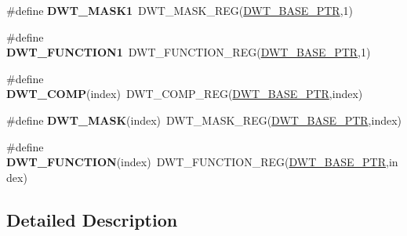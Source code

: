 \begin{DoxyCompactItemize}
\#define {\bfseries D\+W\+T\+\_\+\+M\+A\+S\+K1}~D\+W\+T\+\_\+\+M\+A\+S\+K\+\_\+\+R\+EG(\hyperlink{group___d_w_t___peripheral_ga3b46dfb2ea7946c6938028d879c82cb1}{D\+W\+T\+\_\+\+B\+A\+S\+E\+\_\+\+P\+TR},1)
\item 
\mbox{\label{group___d_w_t___register___accessor___macros_ga6e512f90919120ad3ecf145caafef873}} 
\#define {\bfseries D\+W\+T\+\_\+\+F\+U\+N\+C\+T\+I\+O\+N1}~D\+W\+T\+\_\+\+F\+U\+N\+C\+T\+I\+O\+N\+\_\+\+R\+EG(\hyperlink{group___d_w_t___peripheral_ga3b46dfb2ea7946c6938028d879c82cb1}{D\+W\+T\+\_\+\+B\+A\+S\+E\+\_\+\+P\+TR},1)
\item 
\mbox{\label{group___d_w_t___register___accessor___macros_ga0b043412191960b9db65c179caef9291}} 
\#define {\bfseries D\+W\+T\+\_\+\+C\+O\+MP}(index)~D\+W\+T\+\_\+\+C\+O\+M\+P\+\_\+\+R\+EG(\hyperlink{group___d_w_t___peripheral_ga3b46dfb2ea7946c6938028d879c82cb1}{D\+W\+T\+\_\+\+B\+A\+S\+E\+\_\+\+P\+TR},index)
\item 
\mbox{\label{group___d_w_t___register___accessor___macros_ga19be475d2412ec79ba2fd2a835ce6055}} 
\#define {\bfseries D\+W\+T\+\_\+\+M\+A\+SK}(index)~D\+W\+T\+\_\+\+M\+A\+S\+K\+\_\+\+R\+EG(\hyperlink{group___d_w_t___peripheral_ga3b46dfb2ea7946c6938028d879c82cb1}{D\+W\+T\+\_\+\+B\+A\+S\+E\+\_\+\+P\+TR},index)
\item 
\mbox{\label{group___d_w_t___register___accessor___macros_ga0ef1d1ba0a2ddfb38c74c35ab749a652}} 
\#define {\bfseries D\+W\+T\+\_\+\+F\+U\+N\+C\+T\+I\+ON}(index)~D\+W\+T\+\_\+\+F\+U\+N\+C\+T\+I\+O\+N\+\_\+\+R\+EG(\hyperlink{group___d_w_t___peripheral_ga3b46dfb2ea7946c6938028d879c82cb1}{D\+W\+T\+\_\+\+B\+A\+S\+E\+\_\+\+P\+TR},index)
\end{DoxyCompactItemize}


\subsection{Detailed Description}

